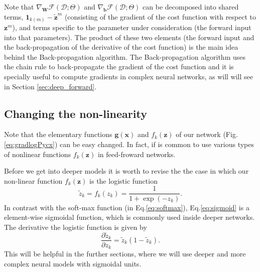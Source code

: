 Note that $\nabla_\mathbf{W}\mathcal{F}(\mathcal{D};\Theta)$ and $\nabla_\mathbf{b}\mathcal{F}(\mathcal{D};\Theta)$ can be decomposed into shared terms, 
$\mathrm{\mathbf{1}}_{k(m)} - \tilde{\mathbf{z}}^m$
%
(consisting of the %
gradient of the cost function %
with respect to $\mathbf{z}^m$), 
and terms specific to the parameter under consideration (the forward input into that parameters).
The product of these two elements (the forward input and the back-propagation of the derivative of the cost function) is the main idea behind the Back-propagation algorithm. The Back-propagation algorithm uses the chain rule to back-propagate the gradient of the cost function %
 and it is specially useful to compute gradients in complex neural networks, as will will see %
in Section \ref{sec:deep_forward}.

\subsection{Changing the non-linearity}

Note that the elementary functions $\mathbf{g}(\mathbf{x})$ and $f_k(\mathbf{z})$ of our network (Fig.\ref{eq:gradlogPycx}) can be easy changed. 
In fact, if is common to use various types of nonlinear functions $f_k(\mathbf{z})$ in feed-froward networks. 

Before we get into deeper models it is worth to revise the
the case in which our
non-linear function $f_k(\mathbf{z})$ is the logistic function
\begin{equation}
\tilde{z}_k = f_k(z_k) = \frac{1}{1+\exp(-z_k)}.
\label{eq:sigmoid}
\end{equation}
%
In contrast with the soft-max function (in Eq.\ref{eq:softmax}), Eq.\ref{eq:sigmoid} is a element-wise  sigmoidal function, which is commonly used inside deeper networks. The derivative the logistic function is given by 
\begin{equation}
\frac{\partial \tilde{z}_k}{\partial z_k} = \tilde{z}_{k} (1-\tilde{z}_{k}).
\label{eq:partsigmoid}
\end{equation}
%
This will be helpful in the further sections, where we will use deeper and more complex neural models with sigmoidal units.

